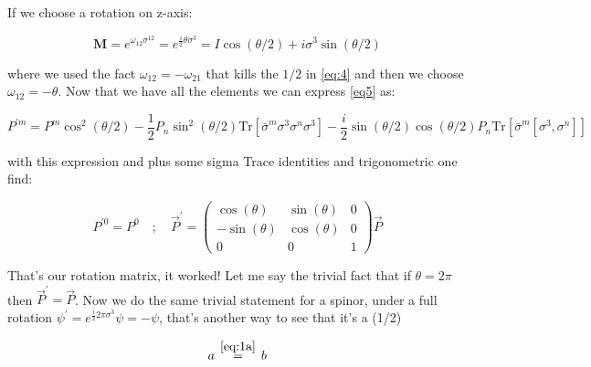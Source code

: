 If we choose a rotation on z-axis:

\begin{equation*}
\mathbf{M} = e^{\omega_{12}\sigma^{12}} = e^{\frac{i}{2}\theta\sigma^{3}} = I\cos(\theta/2) + i\sigma^{3}\sin(\theta/2)
\end{equation*}

where we used the fact $\omega_{12} = -\omega_{21} $ that kills the $1/2$ in \eqref{eq:4} and then we choose  $\omega_{12} = - \theta$. Now that we have all the elements we can express \eqref{eq5} as:

\begin{equation}
P^{'m} = P^{m} \cos^{2}(\theta/2)  -\frac{1}{2}P_{n} \sin^{2}(\theta/2) \text{Tr} [\bar{\sigma}^{m}\sigma^{3}\sigma^{n}\sigma^{3}]   -\frac{i}{2}\sin(\theta/2)\cos(\theta/2)P_{n}\text{Tr} [\bar{\sigma}^{m}[\sigma^{3},\sigma^{n}]]
\end{equation}



with this expression and plus some sigma Trace identities and trigonometric one find:



\begin{equation}
P^{'0} = P^{0} \quad ; \quad \vec{P}^{'} = \begin{pmatrix} 
\cos(\theta) & \sin(\theta) & 0\\
-\sin(\theta) & \cos(\theta) & 0\\
0 &	0	&	1
\end{pmatrix} \vec{P} 
\end{equation}


That's our rotation matrix, it worked! Let me say the trivial fact that if $\theta = 2\pi$ then $\vec{P}^{'}=\vec{P}$. Now we do the same trivial statement for a spinor, under a full rotation $\psi^{'} = e^{\frac{i}{2} 2\pi\sigma^{3}}\psi = -\psi$, that's another way to see that it's a (1/2) 







\begin{equation}
a \, \overset{\eqref{eq:1a}}{=} \, b
\end{equation}